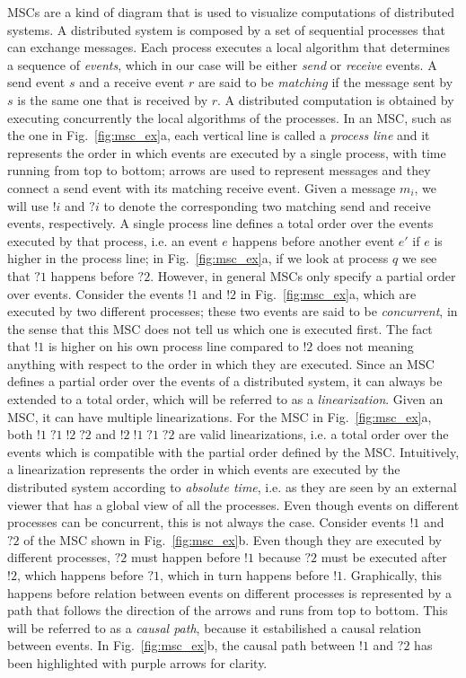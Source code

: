 MSCs are a kind of diagram that is used to visualize computations of distributed systems. A distributed system is composed by a set of sequential processes that can exchange messages. Each process executes a local algorithm that determines a sequence of \emph{events}, which in our case will be either \emph{send} or \emph{receive} events. A send event $s$ and a receive event $r$ are said to be \emph{matching} if the message sent by $s$ is the same one that is received by $r$. A distributed computation is obtained by executing concurrently the local algorithms of the processes. In an MSC, such as the one in Fig.~\ref{fig:msc_ex}a, each vertical line is called a \emph{process line} and it represents the order in which events are executed by a single process, with time running from top to bottom; arrows are used to represent messages and they connect a send event with its matching receive event. Given a message $m_i$, we will use $!i$ and $?i$ to denote the corresponding two matching send and receive events, respectively. A single process line defines a total order over the events executed by that process, i.e. an event $e$ happens before another event $e'$ if $e$ is higher in the process line; in Fig.~\ref{fig:msc_ex}a, if we look at process $q$ we see that $?1$ happens before $?2$. However, in general MSCs only specify a partial order over events. Consider the events $!1$ and $!2$ in Fig.~\ref{fig:msc_ex}a, which are executed by two different processes; these two events are said to be \emph{concurrent}, in the sense that this MSC does not tell us which one is executed first. The fact that $!1$ is higher on his own process line compared to $!2$ does not meaning anything with respect to the order in which they are executed. Since an MSC defines a partial order over the events of a distributed system, it can always be extended to a total order, which will be referred to as a \emph{linearization}. Given an MSC, it can have multiple linearizations. For the MSC in Fig.~\ref{fig:msc_ex}a, both $!1\;?1\;!2\;?2$ and $!2\;!1\;?1\;?2$ are valid linearizations, i.e. a total order over the events which is compatible with the partial order defined by the MSC. Intuitively, a linearization represents the order in which events are executed by the distributed system according to \emph{absolute time}, i.e. as they are seen by an external viewer that has a global view of all the processes. Even though events on different processes can be concurrent, this is not always the case. Consider events $!1$ and $?2$ of the MSC shown in Fig.~\ref{fig:msc_ex}b. Even though they are executed by different processes, $?2$ must happen before $!1$ because $?2$ must be executed after $!2$, which happens before $?1$, which in turn happens before $!1$. Graphically, this happens before relation between events on different processes is represented by a path that follows the direction of the arrows and runs from top to bottom. This will be referred to as a \emph{causal path}, because it estabilished a causal relation between events. In Fig.~\ref{fig:msc_ex}b, the causal path between $!1$ and $?2$ has been highlighted with purple arrows for clarity.

